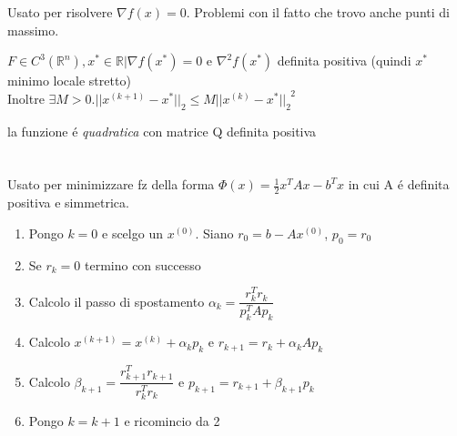 Usato per risolvere $ \nabla f(x) = 0 $. Problemi con il fatto che trovo anche punti di massimo.

\askip

 $ F \in C^3(\mathbb{R}^n), x^* \in \mathbb{R} | \nabla f(x^*) = 0 $ e $ \nabla^2 f(x^*) $ definita positiva (quindi $ x^* $ minimo locale stretto)\\
Inoltre $ \exists M > 0. ||x^{(k+1)}-x^*||_2 \leq M ||x^{(k)}-x^*||_2^{\phantom{2}2} $

\askip

 la funzione \'e \emph{quadratica} con matrice Q definita positiva

\section{}
Usato per minimizzare fz della forma $ \Phi(x) = \frac{1}{2}x^TAx - b^T x $ in cui A \'e definita positiva e simmetrica.

\askip


\askip

\begin{proc}\label{proc:gradienteconiugato}
\begin{enumerate}
\item Pongo $ k = 0 $ e scelgo un $ x^{(0)} $. Siano $ r_0 = b - Ax^{(0)} $, $ p_0 = r_0 $
\item Se $ r_k = 0 $ termino con successo
\item Calcolo il passo di spostamento $ \alpha_k = \dfrac{r_k^T r_k}{p_k^TAp_k} $
\item Calcolo $ x^{(k+1)} = x^{(k)} + \alpha_k p_k $ e $ r_{k+1} = r_k + \alpha_k A p_k $
\item Calcolo $ \beta_{k+1} = \dfrac{r_{k+1}^T r_{k+1}}{r_k^T r_k} $ e $ p_{k+1} = r_{k+1} + \beta_{k+1} p_k $
\item Pongo $ k = k+1 $ e ricomincio da 2
\end{enumerate}
\end{proc}

\askip


